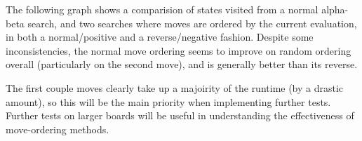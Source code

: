 \documentclass[12pt]{article}
\begin{document}
The following graph shows a comparision of states visited from a normal alpha-beta search, and two searches where moves are ordered by the current evaluation, in both a normal/positive and a reverse/negative fashion. Despite some inconsistencies, the normal move ordering seems to improve on random ordering overall (particularly on the second move), and is generally better than its reverse.
\begin{center}
\end{center}

The first couple moves clearly take up a majoirity of the runtime (by a drastic amount), so this will be the main priority when implementing further tests. Further tests on larger boards will be useful in understanding the effectiveness of move-ordering methods.
\end{document}
